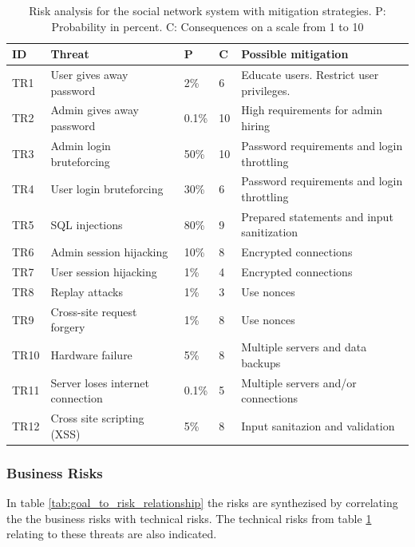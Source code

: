 \documentclass[a4paper]{article}
\begin{document}
\begin{table}[h!]
	\begin{tabular}{| l | p{4cm} | l | l | p{5cm} |}
		\hline
		\textbf{ID} & \textbf{Threat} & \textbf{P} & \textbf{C} & \textbf{Possible mitigation} \\ \hline
		TR1 & User gives away password & 2\% & 6 & Educate users. Restrict user privileges. \\ \hline
        TR2 & Admin gives away password & 0.1\%  & 10 & High requirements for admin hiring \\ \hline
        TR3 & Admin login bruteforcing & 50\% & 10 & Password requirements and login throttling \\ \hline
        TR4 & User login bruteforcing & 30\% & 6 & Password requirements and login throttling \\ \hline
        TR5 & SQL injections & 80\% & 9 & Prepared statements and input sanitization \\ \hline
        TR6 & Admin session hijacking & 10\% & 8 & Encrypted connections \\ \hline
        TR7 & User session hijacking & 1\% & 4 & Encrypted connections \\ \hline
        TR8 & Replay attacks & 1\% & 3 & Use nonces \\ \hline
       	TR9 & Cross-site request forgery & 1\% & 8 & Use nonces \\ \hline
        TR10 & Hardware failure & 5\% & 8 & Multiple servers and data backups \\ \hline
        TR11 & Server loses internet connection & 0.1\% & 5 & Multiple servers and/or connections \\ \hline
        TR12 & Cross site scripting (XSS) & 5\% & 8 & Input sanitazion and validation \\ \hline
	\end{tabular}
	\caption{Risk analysis for the social network system with mitigation strategies. P: Probability in percent. C: Consequences on a scale from 1 to 10}
	\label{tab:risk_analysis}
\end{table}

\subsubsection{Business Risks}
In table \ref{tab:goal_to_risk_relationship} the risks are synthezised by correlating the the business risks with technical risks. The technical risks from table \ref{tab:risk_analysis} relating to these threats are also indicated.
\end{document}
